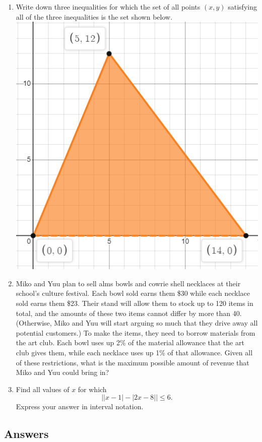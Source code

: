 \begin{enumerate}[resume]
\item Write down three inequalities for which the set of all points $(x,y)$ satisfying all of the three inequalities is the set shown below.
\includegraphics[scale=0.4]{lin-ineq-triangle.png}
\item Miko and Yuu plan to sell alms bowls and cowrie shell necklaces at their school's culture festival. Each bowl sold earns them \$30 while each necklace sold earns them \$23. Their stand will allow them to stock up to 120 items in total, and the amounts of these two items cannot differ by more than 40. (Otherwise, Miko and Yuu will start arguing so much that they drive away all potential customers.) To make the items, they need to borrow materials from the art club. Each bowl uses up 2\% of the material allowance that the art club gives them, while each necklace uses up 1\% of that allowance. Given all of these restrictions, what is the maximum possible amount of revenue that Miko and Yuu could bring in?
\item Find all values of $x$ for which
\begin{equation*}
\lvert\lvert x - 1\rvert - \lvert 2x - 8\rvert\rvert\leq 6.
\end{equation*}
Express your answer in interval notation.
\end{enumerate}


\subsection{Answers}